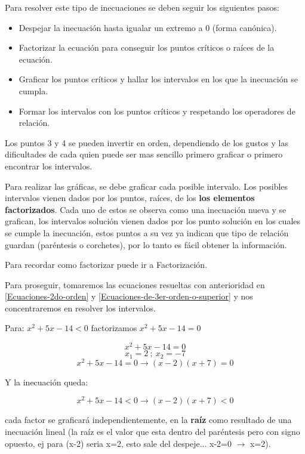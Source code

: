 \documentclass[12pt]{article}
\begin{document}
    Para resolver este tipo de inecuaciones se deben seguir los siguientes pasos:

    \begin{itemize}
        \item Despejar la inecuación hasta igualar un extremo a 0 (forma canónica).
        \item Factorizar la ecuación para conseguir los puntos críticos o raíces
            de la ecuación.
        \item Graficar los puntos críticos y hallar los intervalos en los que
            la inecuación se cumpla.
        \item Formar los intervalos con los puntos críticos y respetando los
            operadores de relación.
    \end{itemize}

    Los puntos 3 y 4 se pueden invertir en orden, dependiendo de los gustos y las
    dificultades de cada quien puede ser mas sencillo primero graficar o primero
    encontrar los intervalos.

    Para realizar las gráficas, se debe graficar cada
    posible intervalo. Los posibles intervalos vienen dados por los puntos, raíces,
    de los \textbf{los elementos factorizados}. Cada uno de estos se observa como
    una inecuación nueva y se grafican, los intervalos solución vienen dados por
    los punto solución en los cuales se cumple la inecuación, estos puntos
    a su vez ya indican que tipo de relación guardan (paréntesis o corchetes),
    por lo tanto es fácil obtener la información.

    Para recordar como factorizar puede ir a \refname{Factorización}.

    Para proseguir, tomaremos las ecuaciones resueltas con anterioridad en
    \ref{Ecuaciones-2do-orden} y \ref{Ecuaciones-de-3er-orden-o-superior}
    y nos concentraremos en resolver los intervalos.

    Para: $x^2+5x-14 < 0$ factorizamos $x^2+5x-14 = 0$


    $$ x^2 + 5x -14 = 0$$
    $$ x_1 = 2\ ;\    x_2 = -7$$
    $$ x^2 + 5x -14 = 0 \longrightarrow  (x-2)(x+7) =0 $$

    Y la inecuación queda:

    $$ x^2 + 5x -14 < 0 \longrightarrow  (x-2)(x+7) < 0 $$

    cada factor se graficará independientemente, en la \textbf{raíz} como resultado
    de una inecuación lineal (la raíz es el valor
    que esta dentro del paréntesis pero con signo opuesto, ej para (x-2) seria
    x=2, esto sale del despeje... x-2=0 $\rightarrow$ x=2).
\end{document}
